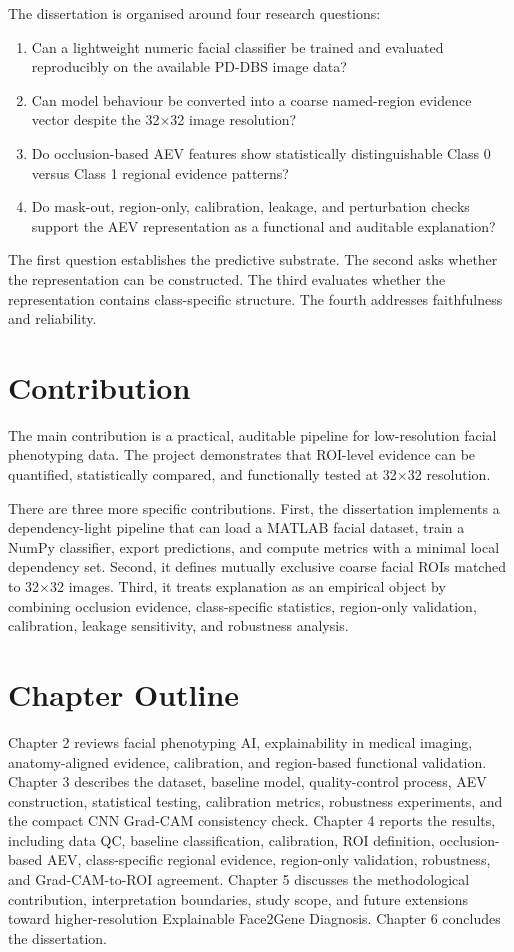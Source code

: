 The dissertation is organised around four research questions:


\begin{enumerate}
\item Can a lightweight numeric facial classifier be trained and evaluated reproducibly on the available PD-DBS image data?
\item Can model behaviour be converted into a coarse named-region evidence vector despite the 32$\times$32 image resolution?
\item Do occlusion-based AEV features show statistically distinguishable Class 0 versus Class 1 regional evidence patterns?
\item Do mask-out, region-only, calibration, leakage, and perturbation checks support the AEV representation as a functional and auditable explanation?
\end{enumerate}

The first question establishes the predictive substrate. The second asks whether the representation can be constructed. The third evaluates whether the representation contains class-specific structure. The fourth addresses faithfulness and reliability.


\section{Contribution}

The main contribution is a practical, auditable pipeline for low-resolution facial phenotyping data. The project demonstrates that ROI-level evidence can be quantified, statistically compared, and functionally tested at 32$\times$32 resolution.


There are three more specific contributions. First, the dissertation implements a dependency-light pipeline that can load a MATLAB facial dataset, train a NumPy classifier, export predictions, and compute metrics with a minimal local dependency set. Second, it defines mutually exclusive coarse facial ROIs matched to 32$\times$32 images. Third, it treats explanation as an empirical object by combining occlusion evidence, class-specific statistics, region-only validation, calibration, leakage sensitivity, and robustness analysis.


\section{Chapter Outline}

Chapter 2 reviews facial phenotyping AI, explainability in medical imaging, anatomy-aligned evidence, calibration, and region-based functional validation. Chapter 3 describes the dataset, baseline model, quality-control process, AEV construction, statistical testing, calibration metrics, robustness experiments, and the compact CNN Grad-CAM consistency check. Chapter 4 reports the results, including data QC, baseline classification, calibration, ROI definition, occlusion-based AEV, class-specific regional evidence, region-only validation, robustness, and Grad-CAM-to-ROI agreement. Chapter 5 discusses the methodological contribution, interpretation boundaries, study scope, and future extensions toward higher-resolution Explainable Face2Gene Diagnosis. Chapter 6 concludes the dissertation.


